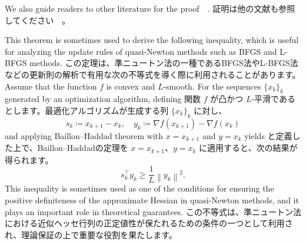 \documentclass[0_main]{subfiles}
\begin{document}
\ifEn
    We also guide readers to other literature for the proof~\citep{bauschkeBaillonHaddadTheoremRevisited2009}~\citep[Proposition 12.60]{rockafellarVariationalAnalysis1998}.
\else
    証明は他の文献も参照してください~\citep{bauschkeBaillonHaddadTheoremRevisited2009}~\citep[Proposition 12.60]{rockafellarVariationalAnalysis1998}。
\fi

\ifEn
    This theorem is sometimes used to derive the following inequality, which is useful for analyzing the update rules of quasi-Newton methods such as BFGS and L-BFGS methods.
\else
    この定理は、準ニュートン法の一種であるBFGS法やL-BFGS法などの更新則の解析で有用な次の不等式を導く際に利用されることがあります。
\fi
\ifEn
    Assume that the function $f$ is convex and $L$-smooth. For the sequences $\{ x_k \}_k$ generated by an optimization algorithm, defining
\else
    関数 $f$ が凸かつ $L$-平滑であるとします。最適化アルゴリズムが生成する列 $\{ x_k \}_k$ に対し、
\fi
\begin{equation*}
    s_k \coloneqq x_{k+1}-x_k, \quad y_k \coloneqq \nabla f(x_{k+1}) - \nabla f(x_k)
\end{equation*}
\ifEn
    and applying Baillon--Haddad theorem with $x=x_{k+1}$ and $y=x_k$ yields
\else
    と定義した上で、Baillon--Haddadの定理を $x=x_{k+1}$、$y=x_k$ に適用すると、次の結果が得られます。
\fi
\begin{equation*}
    s_k^\top y_k \ge \frac{1}{L} \left\lVert y_k \right\rVert^2.
\end{equation*}
\ifEn
    This inequality is sometimes used as one of the conditions for ensuring the positive definiteness of the approximate Hessian in quasi-Newton methods, and it plays an important role in theoretical guarantees.
\else
    この不等式は、準ニュートン法における近似ヘッセ行列の正定値性が保たれるための条件の一つとして利用され、理論保証の上で重要な役割を果たします。
\fi

\ifSubfilesClassLoaded{
    
    
}{}
\end{document}
